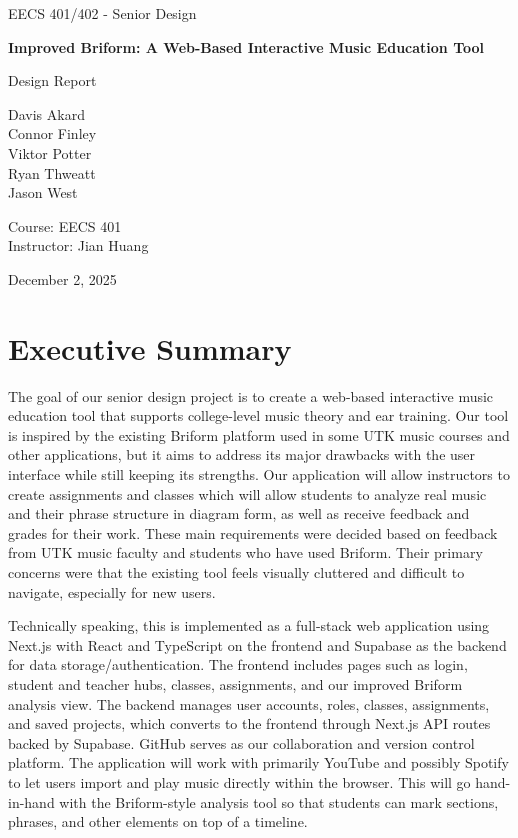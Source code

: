 \documentclass[12pt, letterpaper]{article}
\begin{document}
\begin{titlepage}
    \centering
    {\Large EECS 401/402 - Senior Design \par}
    \vspace{1cm}
    {\huge\bfseries Improved Briform: A Web-Based Interactive Music Education Tool\par}
    \vspace{1cm}
    {\Large Design Report\par}
    \vfill
    {\large
    Davis Akard \\
    Connor Finley \\
    Viktor Potter \\
    Ryan Thweatt \\
    Jason West\par}
    \vspace{1cm}
    {\large
    Course: EECS 401 \\
    Instructor: Jian Huang\par}
    \vfill
    {\large December 2, 2025 \par}
\end{titlepage}

\section*{Executive Summary}
The goal of our senior design project is to create a web-based interactive music education tool that supports college-level music theory and ear training. Our tool is inspired by the existing Briform platform used in some UTK music courses and other applications, but it aims to address its major drawbacks with the user interface while still keeping its strengths. Our application will allow instructors to create assignments and classes which will allow students to analyze real music and their phrase structure in diagram form, as well as receive feedback and grades for their work. These main requirements were decided based on feedback from UTK music faculty and students who have used Briform. Their primary concerns were that the existing tool feels visually cluttered and difficult to navigate, especially for new users.

Technically speaking, this is implemented as a full-stack web application using Next.js with React and TypeScript on the frontend and Supabase as the backend for data storage/authentication. The frontend includes pages such as login, student and teacher hubs, classes, assignments, and our improved Briform analysis view. The backend manages user accounts, roles, classes, assignments, and saved projects, which converts to the frontend through Next.js API routes backed by Supabase. GitHub serves as our collaboration and version control platform. The application will work with primarily YouTube and possibly Spotify to let users import and play music directly within the browser. This will go hand-in-hand with the Briform-style analysis tool so that students can mark sections, phrases, and other elements on top of a timeline.
\end{document}
